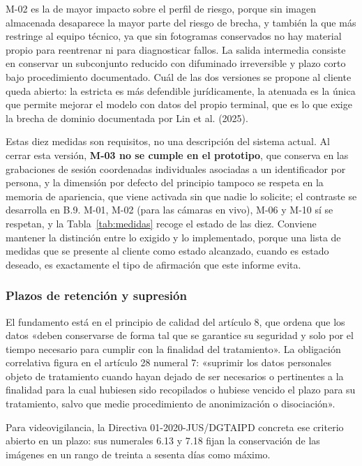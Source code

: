 M-02 es la de mayor impacto sobre el perfil de riesgo, porque sin imagen
almacenada desaparece la mayor parte del riesgo de brecha, y también la
que más restringe al equipo técnico, ya que sin fotogramas conservados
no hay material propio para reentrenar ni para diagnosticar fallos. La
salida intermedia consiste en conservar un subconjunto reducido con
difuminado irreversible y plazo corto bajo procedimiento documentado.
Cuál de las dos versiones se propone al cliente queda abierto: la
estricta es más defendible jurídicamente, la atenuada es la única que
permite mejorar el modelo con datos del propio terminal, que es lo que
exige la brecha de dominio documentada por Lin et al. (2025).

Estas diez medidas son requisitos, no una descripción del sistema
actual. Al cerrar esta versión, \textbf{M-03 no se cumple en el prototipo},
que conserva en las grabaciones de sesión coordenadas individuales asociadas a
un identificador por persona, y la dimensión por defecto del principio
tampoco se respeta en la memoria de apariencia, que viene activada sin que
nadie lo solicite; el contraste se desarrolla en B.9. M-01, M-02 (para las
cámaras en vivo), M-06 y M-10 sí se respetan, y la
Tabla~\ref{tab:medidas} recoge el estado de las diez. Conviene mantener la
distinción entre lo exigido y lo implementado, porque una lista de medidas
que se presente al cliente como estado alcanzado, cuando es estado deseado,
es exactamente el tipo de afirmación que este informe evita.

\subsubsection{Plazos de retención y supresión}

El fundamento está en el principio de calidad del artículo 8, que ordena
que los datos «deben conservarse de forma tal que se garantice su
seguridad y solo por el tiempo necesario para cumplir con la finalidad
del tratamiento». La obligación correlativa figura en el artículo 28
numeral 7: «suprimir los datos personales objeto de tratamiento cuando
hayan dejado de ser necesarios o pertinentes a la finalidad para la cual
hubiesen sido recopilados o hubiese vencido el plazo para su
tratamiento, salvo que medie procedimiento de anonimización o
disociación».

Para videovigilancia, la Directiva 01-2020-JUS/DGTAIPD concreta ese
criterio abierto en un plazo: sus numerales 6.13 y 7.18 fijan la
conservación de las imágenes en un rango de treinta a sesenta días como
máximo.


